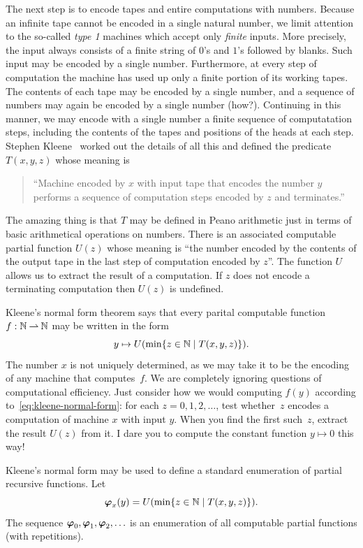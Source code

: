 The next step is to encode tapes and entire computations with numbers.
Because an infinite tape cannot be encoded in a single natural number,
we limit attention to the so-called \emph{type 1} machines which
accept only \emph{finite} inputs. More precisely, the input always
consists of a finite string of $0$'s and $1$'s followed by blanks.
Such input may be encoded by a single number. Furthermore, at every
step of computation the machine has used up only a finite portion of
its working tapes. The contents of each tape may be encoded by a
single number, and a sequence of numbers may again be encoded by a
single number (how?). Continuing in this manner, we may encode with a
single number a finite sequence of computatation steps, including the
contents of the tapes and positions of the heads at each step. Stephen
Kleene~\cite{kleeneT} worked out the details of all this and defined
the predicate $T(x,y,z)$ whose meaning is
%
\begin{quote}
  ``Machine encoded by $x$ with input tape that encodes the number $y$
  performs a sequence of computation steps encoded by $z$ and
  terminates.''
\end{quote}
%
The amazing thing is that $T$ may be defined in Peano arithmetic just
in terms of basic arithmetical operations on numbers. There is an
associated computable partial function $U(z)$ whose meaning is ``the
number encoded by the contents of the output tape in the last step of
computation encoded by $z$''. The function $U$ allows us to extract
the result of a computation. If $z$ does not encode a terminating
computation then $U(z)$ is undefined.

Kleene's normal form theorem says that every parital computable
function $f : \mathbb{N} \mathbin{\rightharpoonup} \mathbb{N}$ may be written in the form
%
\begin{equation}
  \label{eq:kleene-normal-form}
  y \mapsto U(\min \{z \in \mathbb{N} \mid T(x,y,z)\}).
\end{equation}
%
The number $x$ is not uniquely determined, as we may take it to be the
encoding of any machine that computes~$f$. We are completely ignoring
questions of computational efficiency. Just consider how we would
computing $f(y)$ according to~\eqref{eq:kleene-normal-form}: for each
$z = 0, 1, 2, \ldots$, test whether~$z$ encodes a computation of
machine $x$ with input $y$. When you find the first such~$z$, extract
the result $U(z)$ from it. I dare you to compute the constant function
$y \mapsto 0$ this way!

Kleene's normal form may be used to define a standard enumeration of
partial recursive functions. Let
%
\begin{equation*}
  \text{\boldmath{$\varphi$}}_{x}(y) = U(\min \{z \in \mathbb{N} \mid T(x,y,z)\}).
\end{equation*}
%
The sequence $\text{\boldmath{$\varphi$}}_0, \text{\boldmath{$\varphi$}}_1, \text{\boldmath{$\varphi$}}_2, \ldots$ is an enumeration of all
computable partial functions (with repetitions).

